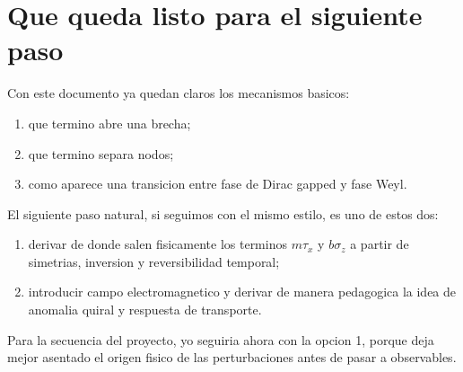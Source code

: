 \section{Que queda listo para el siguiente paso}

Con este documento ya quedan claros los mecanismos basicos:

\begin{enumerate}[leftmargin=*]
  \item que termino abre una brecha;
  \item que termino separa nodos;
  \item como aparece una transicion entre fase de Dirac gapped y fase Weyl.
\end{enumerate}

El siguiente paso natural, si seguimos con el mismo estilo, es uno de estos dos:

\begin{enumerate}[leftmargin=*]
  \item derivar de donde salen fisicamente los terminos \(m\tau_x\) y \(b\sigma_z\) a partir de simetrias, inversion y reversibilidad temporal;
  \item introducir campo electromagnetico y derivar de manera pedagogica la idea de anomalia quiral y respuesta de transporte.
\end{enumerate}

Para la secuencia del proyecto, yo seguiria ahora con la opcion 1, porque deja mejor asentado el origen fisico de las perturbaciones antes de pasar a observables.

